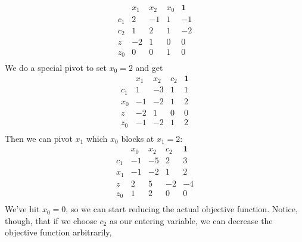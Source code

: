 \documentclass[12pt]{article}
\begin{document}
\begin{enumerate}
\begin{enumerate}
\[\begin{array}{c|rrr|l}
                                        & x_1 & x_2 & x_0 & \mathbf{1} \\ \hline
                                    c_1 & 2   & -1  & 1   & -1         \\
                                    c_2 & 1   & 2   & 1   & -2         \\ \hline
                                    z   & -2  & 1   & 0   & 0          \\ \hline
                                    z_0 & 0   & 0   & 1   & 0          \\
                              \end{array}\]
                        We do a special pivot to set $x_0=2$ and get
                        \[\begin{array}{c|rrr|l}
                                        & x_1 & x_2 & c_2 & \mathbf{1} \\ \hline
                                    c_1 & 1   & -3  & 1   & 1          \\
                                    x_0 & -1  & -2  & 1   & 2          \\ \hline
                                    z   & -2  & 1   & 0   & 0          \\ \hline
                                    z_0 & -1  & -2  & 1   & 2          \\
                              \end{array}\]
                        Then we can pivot $x_1$ which $x_0$ blocks at $x_1=2$:
                        \[\begin{array}{c|rrr|l}
                                        & x_0 & x_2 & c_2 & \mathbf{1} \\ \hline
                                    c_1 & -1  & -5  & 2   & 3          \\
                                    x_1 & -1  & -2  & 1   & 2          \\ \hline
                                    z   & 2   & 5   & -2  & -4         \\ \hline
                                    z_0 & 1   & 2   & 0   & 0          \\
                              \end{array}\]
                        We've hit $x_0=0$, so we can start reducing the actual objective function.
                        Notice, though, that if we choose $c_2$ as our entering variable,
                        we can decrease the objective function arbitrarily,

\end{enumerate}
\end{enumerate}
\end{document}
